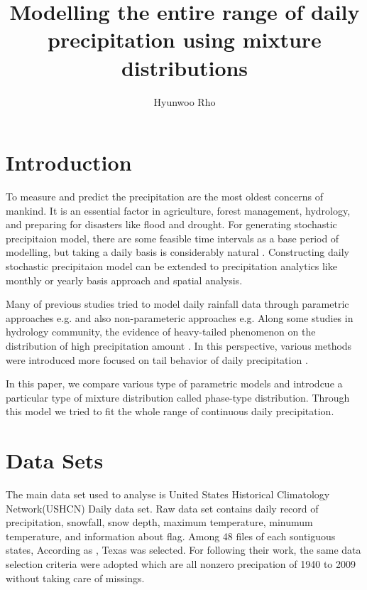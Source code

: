 \documentclass[12pt]{article}\usepackage[]{graphicx}\usepackage[]{color}
\begin{document}
\title{Modelling the entire range of daily precipitation using mixture distributions}
\author{Hyunwoo Rho}
\date{}

\maketitle

\section{Introduction}


To measure and predict the precipitation are the most oldest concerns of mankind. It is an essential factor in agriculture, forest management, hydrology, and preparing for disasters like flood and drought. For generating stochastic precipitaion model, there are some feasible time intervals as a base period of modelling, but taking a daily basis is considerably natural \cite{richardson1981stochastic}. Constructing daily stochastic precipitaion model can be extended to precipitation analytics like monthly or yearly basis approach and spatial analysis. 


Many of previous studies tried to model daily rainfall data through parametric approaches e.g. \cite{ison1971wet, mielke1973three, richardson1981stochastic, stern1984model} and also non-parameteric approaches e.g. \cite{sharma1999nonparametric, harrold2003nonparametric}Along some studies in hydrology community, the evidence of heavy-tailed phenomenon on the distribution of high precipitation amount \cite{koutsoyiannis2004statistics}. In this perspective, various methods were introduced more focused on tail behavior of daily precipitation \cite{furrer2008improving, li2012simulation, papalexiou2012entropy, papalexiou2013extreme}. 


In this paper, we compare various type of parametric models and introdcue a particular type of mixture distribution called phase-type distribution. Through this model we tried to fit the whole range of continuous daily precipitation.


\section{Data Sets}


The main data set used to analyse is United States Historical Climatology Network(USHCN) Daily data set. Raw data set contains daily record of precipitation, snowfall, snow depth, maximum temperature, minumum temperature, and information about flag. Among 48 files of each sontiguous states, According as \cite{li2012simulation}, Texas was selected. For following their work, the same data selection criteria were adopted which are all nonzero precipation of 1940 to 2009 without taking care of missings. 
\end{document}
